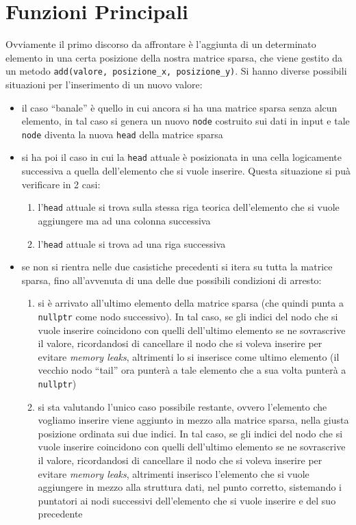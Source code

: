 \documentclass[a4paper,12pt, oneside]{article}
\begin{document}
\section*{Funzioni Principali}
Ovviamente il primo discorso da affrontare è l'aggiunta di un
determinato elemento in una certa posizione della nostra matrice
sparsa, che viene gestito da un metodo \texttt{add(valore,
  posizione\_x, posizione\_y)}. Si hanno diverse possibili situazioni
per l'inserimento di un nuovo valore:
\begin{itemize}
  \item il caso ``banale'' è quello in cui ancora si ha una matrice
  sparsa senza alcun elemento, in tal caso si genera un nuovo
  \texttt{node} costruito sui dati in input e tale \texttt{node}
  diventa la nuova \texttt{head} della matrice sparsa
  \item si ha poi il caso in cui la \texttt{head} attuale è
  posizionata in una cella logicamente successiva a quella
  dell'elemento che si vuole inserire. Questa situazione si puà
  verificare in 2 casi:
  \begin{enumerate}
    \item l'\texttt{head} attuale si trova sulla stessa riga teorica
    dell'elemento che si vuole aggiungere ma ad una colonna successiva
    \item l'\texttt{head} attuale si trova ad una riga successiva
  \end{enumerate}
  \item se non si rientra nelle due casistiche precedenti si itera su
  tutta la matrice sparsa, fino all'avvenuta di una delle due
  possibili condizioni di arresto:
  \begin{enumerate}
    \item si è arrivato all'ultimo elemento della matrice sparsa (che
    quindi punta a \texttt{nullptr} come nodo successivo). In tal
    caso, se gli indici del nodo che si vuole inserire coincidono con
    quelli dell'ultimo elemento se ne sovrascrive il valore,
    ricordandosi di cancellare il nodo che si voleva inserire per
    evitare \textit{memory leaks}, altrimenti lo si inserisce come
    ultimo elemento (il vecchio nodo ``tail'' ora punterà a tale
    elemento che a sua volta punterà a \texttt{nullptr})
    \item si sta valutando l'unico caso possibile restante, ovvero
    l'elemento che vogliamo inserire viene aggiunto in mezzo alla
    matrice sparsa, nella giusta posizione ordinata sui due indici. In
    tal caso, se gli indici del nodo che si vuole inserire coincidono
    con quelli dell'ultimo elemento se ne sovrascrive il valore,
    ricordandosi di cancellare il nodo che si voleva inserire per
    evitare \textit{memory leaks}, altrimenti inserisco l'elemento che
    si vuole aggiungere in mezzo alla struttura dati, nel punto
    corretto, sistemando i puntatori ai nodi successivi dell'elemento
    che si vuole inserire e del suo precedente
  \end{enumerate}
\end{itemize}
\end{document}
